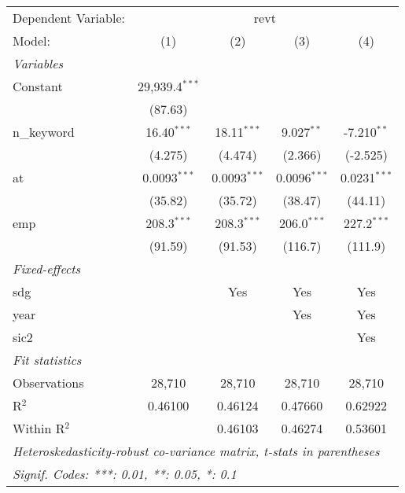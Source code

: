 
\begingroup
\centering
\begin{tabular}{lcccc}
   \tabularnewline \midrule \midrule
   Dependent Variable: & \multicolumn{4}{c}{revt}\\
   Model:       & (1)              & (2)            & (3)            & (4)\\  
   \midrule
   \emph{Variables}\\
   Constant     & 29,939.4$^{***}$ &                &                &   \\   
                & (87.63)          &                &                &   \\   
   n\_keyword   & 16.40$^{***}$    & 18.11$^{***}$  & 9.027$^{**}$   & -7.210$^{**}$\\   
                & (4.275)          & (4.474)        & (2.366)        & (-2.525)\\   
   at           & 0.0093$^{***}$   & 0.0093$^{***}$ & 0.0096$^{***}$ & 0.0231$^{***}$\\   
                & (35.82)          & (35.72)        & (38.47)        & (44.11)\\   
   emp          & 208.3$^{***}$    & 208.3$^{***}$  & 206.0$^{***}$  & 227.2$^{***}$\\   
                & (91.59)          & (91.53)        & (116.7)        & (111.9)\\   
   \midrule
   \emph{Fixed-effects}\\
   sdg          &                  & Yes            & Yes            & Yes\\  
   year         &                  &                & Yes            & Yes\\  
   sic2         &                  &                &                & Yes\\  
   \midrule
   \emph{Fit statistics}\\
   Observations & 28,710           & 28,710         & 28,710         & 28,710\\  
   R$^2$        & 0.46100          & 0.46124        & 0.47660        & 0.62922\\  
   Within R$^2$ &                  & 0.46103        & 0.46274        & 0.53601\\  
   \midrule \midrule
   \multicolumn{5}{l}{\emph{Heteroskedasticity-robust co-variance matrix, t-stats in parentheses}}\\
   \multicolumn{5}{l}{\emph{Signif. Codes: ***: 0.01, **: 0.05, *: 0.1}}\\
\end{tabular}
\par\endgroup


